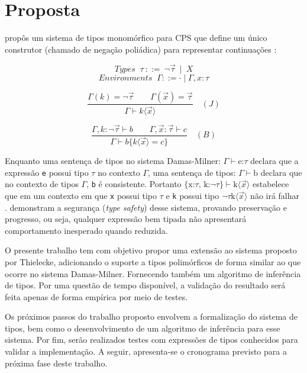 \chapter{Proposta}\label{ch:proposta}

 propôs um sistema de tipos monomórfico para CPS que define um único construtor (chamado de negação poliádica) para representar continuações \cite{TORRENS2024}:


\[
    \textit{Types } \ \tau \ ::= \ \neg \vec{\tau} \ \mid \ X
\]
\[
    \textit{Environments } \ \Gamma ::= \cdot \mid \Gamma, x : \tau
\]

\[
\frac{
  \Gamma(k) = \neg \vec{\tau} 
  \quad \quad
  \Gamma(\vec{x}) = \vec{\tau}
}{
  \Gamma \vdash k\langle \vec{x} \rangle
} \quad (J)
\]

\[
\frac{
  \Gamma, k : \neg \vec{\tau} \vdash b
  \quad \quad
  \Gamma, \vec{x} : \vec{\tau} \vdash c
}{
  \Gamma \vdash b \{ k \langle \vec{x} \rangle = c \}
} \quad (B)
\]

Enquanto uma sentença de tipos no sistema Damas-Milner: $\Gamma \vdash \text{e:}\tau$ declara que a expressão \texttt{e} possui tipo $\tau$ no contexto $\Gamma$, uma sentença de tipos: $\Gamma \vdash \text{b}$ declara que no contexto de tipos $\Gamma$, \texttt{b} é consistente.
Portanto $\{\text{x:}\tau \text{, k:} \neg \tau\} \vdash \text{k}\langle \vec{x} \rangle$ estabelece que em um contexto em que \texttt{x} possui tipo $\tau$ e \texttt{k} possui tipo $\neg \tau \text{k}\langle \vec{x} \rangle$ não irá falhar \cite{thielecke1997}.
 demonstram a segurança (\textit{type safety}) desse sistema, provando preservação e progresso, ou seja, qualquer expressão bem tipada não apresentará comportamento inesperado quando reduzida.

O presente trabalho tem com objetivo propor uma extensão ao sistema proposto por Thielecke, adicionando o suporte a tipos polimórficos de forma similar ao que ocorre no sistema Damas-Milner.
Fornecendo também um algoritmo de inferência de tipos.
Por uma questão de tempo disponível, a validação do resultado será feita apenas de forma empírica por meio de testes.

Os próximos passos do trabalho proposto envolvem a formalização do sistema de tipos, bem como o desenvolvimento de um algoritmo de inferência para esse sistema.
Por fim, serão realizados testes com expressões de tipos conhecidos para validar a implementação.
A seguir, apresenta-se o cronograma previsto para a próxima fase deste trabalho.

